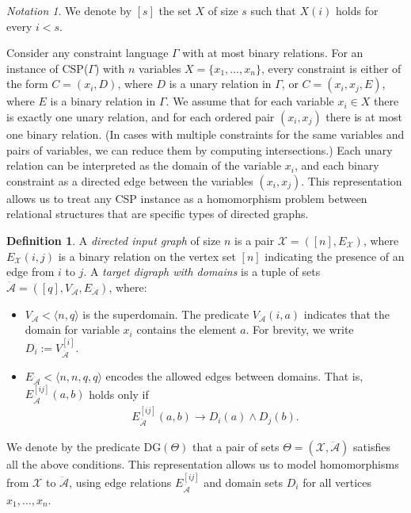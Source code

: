 \documentclass{article}
\theoremstyle{definition}
\newtheorem{df}{Definition}
\theoremstyle{theorem}
\theoremstyle{theorem}
\theoremstyle{remark}
\theoremstyle{remark}
\theoremstyle{example}
\theoremstyle{notation}
\newtheorem{notation}{Notation}
\theoremstyle{theorem}
\begin{document}
\begin{notation}
We denote by $[s]$ the set $X$ of size $s$ such that $X(i)$ holds for every $i < s$.
\end{notation}

Consider any constraint language $\Gamma$ with at most binary relations. For an instance of CSP($\Gamma$) with $n$ variables $X=\{x_1,\ldots,x_n\}$, every constraint is either of the form $C = (x_i, D)$, where $D$ is a unary relation in $\Gamma$, or $C = (x_i, x_j, E)$, where $E$ is a binary relation in $\Gamma$. We assume that for each variable $x_i \in X$ there is exactly one unary relation, and for each ordered pair $(x_i, x_j)$ there is at most one binary relation. (In cases with multiple constraints for the same variables and pairs of variables, we can reduce them by computing intersections.) Each unary relation can be interpreted as the domain of the variable $x_i$, and each binary constraint as a directed edge between the variables $(x_i, x_j)$. This representation allows us to treat any CSP instance as a homomorphism problem between relational structures that are specific types of directed graphs. 

\begin{df}\label{DIGRAPHSS}
A \emph{directed input graph} of size $n$ is a pair $\mathcal{X} = ([n], E_\mathcal{X})$, where $E_\mathcal{X}(i,j)$ is a binary relation on the vertex set $[n]$ indicating the presence of an edge from $i$ to $j$. A \emph{target digraph with domains} is a tuple of sets $\ddot{\mathcal{A}} = ([q], V_{\ddot{\mathcal{A}}}, E_{\ddot{\mathcal{A}}})$, where:
\begin{itemize}
    \item $V_{\ddot{\mathcal{A}}} < \langle n, q \rangle$ is the superdomain. The predicate $V_{\ddot{\mathcal{A}}}(i, a)$ indicates that the domain for variable $x_i$ contains the element $a$. For brevity, we write $D_i := V_{\ddot{\mathcal{A}}}^{[i]}$.
    
    \item $E_{\ddot{\mathcal{A}}} < \langle n, n, q, q \rangle$ encodes the allowed edges between domains. That is, $E_{\ddot{\mathcal{A}}}^{[ij]}(a,b)$ holds only if
    \begin{equation}
        \begin{gathered}
            E_{\ddot{\mathcal{A}}}^{[ij]}(a,b) \rightarrow D_i(a) \wedge D_j(b).
        \end{gathered}
    \end{equation}
\end{itemize}
We denote by the predicate DG$(\Theta)$ that a pair of sets $\Theta = (\mathcal{X}, \ddot{\mathcal{A}})$ satisfies all the above conditions. This representation allows us to model homomorphisms from $\mathcal{X}$ to $\ddot{\mathcal{A}}$, using edge relations $E_{\ddot{\mathcal{A}}}^{[ij]}$ and domain sets $D_i$ for all vertices $x_1, \ldots, x_n$.
\end{df}
\end{document}
